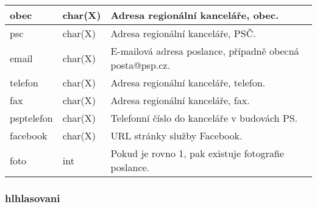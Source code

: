 \begin{center}
\begin{longtable}{|l|l|p{9cm}|}
		\hline 
		
		obec & char(X) & Adresa regionální kanceláře, obec. \\
		
		\hline 
		
		psc & char(X) & Adresa regionální kanceláře, PSČ. \\
		
		\hline 
		
		email & char(X) & E-mailová adresa poslance, případně obecná posta@psp.cz. \\
		
		\hline 
		
		telefon & char(X) & Adresa regionální kanceláře, telefon. \\
		
		\hline 
		
		fax & char(X) & Adresa regionální kanceláře, fax. \\
		
		\hline 
		
		psp\textunderscore telefon & char(X) & Telefonní číslo do kanceláře v budovách PS. \\
		
		\hline 
		
		facebook & char(X) & URL stránky služby Facebook. \\
		
		\hline 
		
		foto & int & Pokud je rovno 1, pak existuje fotografie poslance. \\
		
		\hline 
		
	\end{longtable}
\end{center}

\subsubsection{hl\textunderscore hlasovani}

